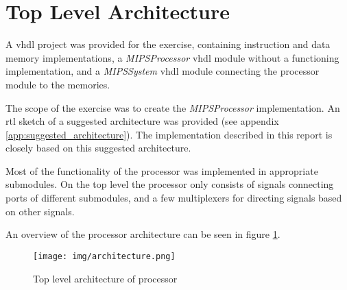 \section{Top Level Architecture}
A \gls{vhdl} project was provided for the exercise,
containing instruction and data memory implementations,
a \textit{MIPSProcessor} \gls{vhdl} module without a functioning implementation,
and a \textit{MIPSSystem} \gls{vhdl} module connecting the processor module to the memories.

The scope of the exercise was to create the \textit{MIPSProcessor} implementation.
An \gls{rtl} sketch of a suggested architecture was provided (see appendix \ref{app:suggested_architecture}).
The implementation described in this report is closely based on this suggested architecture.

Most of the functionality of the processor was implemented in appropriate submodules.
On the top level the processor only consists of signals connecting ports of different submodules,
and a few multiplexers for directing signals based on other signals.

An overview of the processor architecture can be seen in figure \ref{fig:architecture}.

\begin{figure}[p]
    \centering
    \texttt{[image: img/architecture.png]}
    \caption{Top level architecture of processor}
    \label{fig:architecture}
\end{figure}


